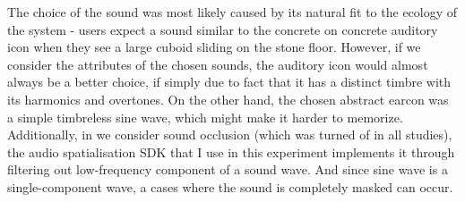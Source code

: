 The choice of the sound was most likely caused by its natural fit to the ecology of the system - users expect a sound similar to the concrete on concrete auditory icon when they see a large cuboid sliding on the stone floor. However, if we consider the attributes of the chosen sounds, the auditory icon would almost always be a better choice, if simply due to fact that it has a distinct timbre with its harmonics and overtones. On the other hand, the chosen abstract earcon was a simple timbreless sine wave, which might make it harder to memorize.
Additionally, in we consider sound occlusion (which was turned of in all studies), the audio spatialisation SDK that I use in this experiment implements it through filtering out low-frequency component of a sound wave. And since sine wave is a single-component wave, a cases where the sound is completely masked can occur.

